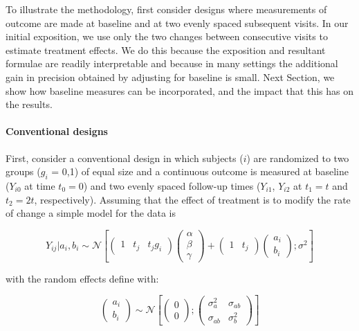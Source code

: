 \documentclass[final, paper=letter,5p,times,twocolumn]{elsarticle}
\theoremstyle{definition}
\begin{document}
To illustrate the methodology, first consider designs where measurements of outcome are made at baseline and at two evenly spaced subsequent visits. In our initial exposition, we use only the two changes between consecutive visits to estimate treatment effects. We do this because the exposition and resultant formulae are readily interpretable and because in many settings the additional gain in precision obtained by adjusting for baseline is small. Next Section, we show how baseline measures can be incorporated, and the impact that this has on the results.

\paragraph{Conventional designs}{First, consider a conventional design in which subjects ($i$) are randomized to two groups ($g_{i}$ = 0,1) of equal size and a continuous outcome is measured at baseline ($Y_{i0}$ at time $t_{0} = 0$) and two evenly spaced follow-up times ($Y_{i1}$, $Y_{i2}$ at $t_{1} = t$ and $t_{2} = 2t$, respectively). Assuming that the effect of treatment is to modify the rate of change a simple model for the data is

\begin{equation*}
  Y_{ij}|a_{i}, b_{i} \sim \mathcal{N} \left[
    \left(
    \begin{array}{ccc}
      1 & t_{j} & t_{j}g_{i}
    \end{array}
    \right)
    \left(
    \begin{array}{c}
      \alpha \\
      \beta \\
      \gamma
    \end{array}
    \right) +     \left(
    \begin{array}{cc}
      1 & t_{j}
    \end{array}
    \right)
    \left(
    \begin{array}{c}
      a_{i} \\
      b_{i}
    \end{array}
    \right) ; \sigma^{2}
    \right]
\end{equation*}

with the random effects define with:

\begin{equation*}
  \left(
  \begin{array}{c}
    a_{i} \\
    b_{i}
  \end{array}
  \right) \sim \mathcal{N} \left[
      \left(
  \begin{array}{c}
    0 \\
    0
  \end{array}
  \right) ;  \left(
  \begin{array}{cc}
    \sigma_{a}^{2} & \sigma_{ab} \\
    \sigma_{ab} & \sigma_{b}^{2}
  \end{array}
  \right) 
    \right]
\end{equation*}

}
\end{document}

